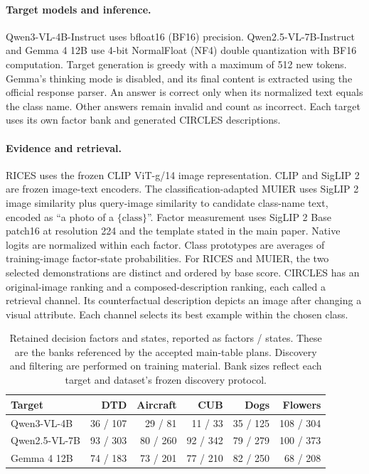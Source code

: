 \documentclass[10pt,twocolumn,letterpaper]{article}
\begin{document}
\paragraph{Target models and inference.}
Qwen3-VL-4B-Instruct uses bfloat16 (BF16) precision. Qwen2.5-VL-7B-Instruct and Gemma 4 12B use 4-bit NormalFloat (NF4) double quantization with BF16 computation. Target generation is greedy with a maximum of 512 new tokens. Gemma's thinking mode is disabled, and its final content is extracted using the official response parser. An answer is correct only when its normalized text equals the class name. Other answers remain invalid and count as incorrect. Each target uses its own factor bank and generated CIRCLES descriptions.

\paragraph{Evidence and retrieval.}
RICES uses the frozen CLIP ViT-g/14 image representation. CLIP and SigLIP 2 are frozen image-text encoders. The classification-adapted MUIER uses SigLIP 2 image similarity plus query-image similarity to candidate class-name text, encoded as ``a photo of a $\{\text{class}\}$''. Factor measurement uses SigLIP 2 Base patch16 at resolution 224 and the template stated in the main paper. Native logits are normalized within each factor. Class prototypes are averages of training-image factor-state probabilities. For RICES and MUIER, the two selected demonstrations are distinct and ordered by base score. CIRCLES has an original-image ranking and a composed-description ranking, each called a retrieval channel. Its counterfactual description depicts an image after changing a visual attribute. Each channel selects its best example within the chosen class.

\begin{table}[t]
\caption{Retained decision factors and states, reported as factors / states. These are the banks referenced by the accepted main-table plans. Discovery and filtering are performed on training material. Bank sizes reflect each target and dataset's frozen discovery protocol.}
\label{tab:banks}
\centering\small
\setlength{\tabcolsep}{9pt}
\begin{tabular}{lrrrrr}
\toprule
Target & DTD & Aircraft & CUB & Dogs & Flowers \\
\midrule
Qwen3-VL-4B & 36 / 107 & 29 / 81 & 11 / 33 & 35 / 125 & 108 / 304 \\
Qwen2.5-VL-7B & 93 / 303 & 80 / 260 & 92 / 342 & 79 / 279 & 100 / 373 \\
Gemma 4 12B & 74 / 183 & 73 / 201 & 77 / 210 & 82 / 250 & 68 / 208 \\
\bottomrule
\end{tabular}
\end{table}
\end{document}
